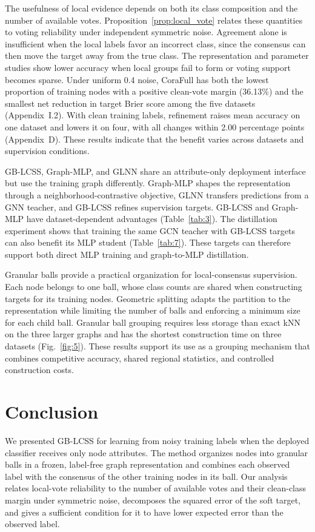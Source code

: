 \documentclass[times,review,10pt]{elsarticle}
\theoremstyle{definition}
\theoremstyle{plain}
\begin{document}
The usefulness of local evidence depends on both its class composition and the number of available votes. Proposition~\ref{prop:local_vote} relates these quantities to voting reliability under independent symmetric noise. Agreement alone is insufficient when the local labels favor an incorrect class, since the consensus can then move the target away from the true class. The representation and parameter studies show lower accuracy when local groups fail to form or voting support becomes sparse. Under uniform 0.4 noise, CoraFull has both the lowest proportion of training nodes with a positive clean-vote margin (36.13\%) and the smallest net reduction in target Brier score among the five datasets (Appendix~I.2). With clean training labels, refinement raises mean accuracy on one dataset and lowers it on four, with all changes within 2.00 percentage points (Appendix~D). These results indicate that the benefit varies across datasets and supervision conditions.

GB-LCSS, Graph-MLP, and GLNN share an attribute-only deployment interface but use the training graph differently. Graph-MLP shapes the representation through a neighborhood-contrastive objective, GLNN transfers predictions from a GNN teacher, and GB-LCSS refines supervision targets. GB-LCSS and Graph-MLP have dataset-dependent advantages (Table~\ref{tab:3}). The distillation experiment shows that training the same GCN teacher with GB-LCSS targets can also benefit its MLP student (Table~\ref{tab:7}). These targets can therefore support both direct MLP training and graph-to-MLP distillation.

Granular balls provide a practical organization for local-consensus supervision. Each node belongs to one ball, whose class counts are shared when constructing targets for its training nodes. Geometric splitting adapts the partition to the representation while limiting the number of balls and enforcing a minimum size for each child ball. Granular ball grouping requires less storage than exact kNN on the three larger graphs and has the shortest construction time on three datasets (Fig.~\ref{fig:5}). These results support its use as a grouping mechanism that combines competitive accuracy, shared regional statistics, and controlled construction costs.

\section{Conclusion}\label{sec:5}

We presented GB-LCSS for learning from noisy training labels when the deployed classifier receives only node attributes. The method organizes nodes into granular balls in a frozen, label-free graph representation and combines each observed label with the consensus of the other training nodes in its ball. Our analysis relates local-vote reliability to the number of available votes and their clean-class margin under symmetric noise, decomposes the squared error of the soft target, and gives a sufficient condition for it to have lower expected error than the observed label.
\end{document}
